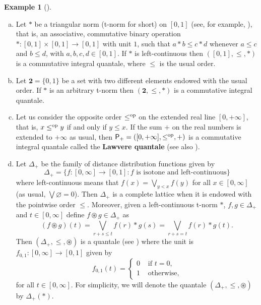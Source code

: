 \documentclass[11pt,a4paper]{amsart}
\theoremstyle{definition}
\newtheorem{example}[theorem]{Example}
\begin{document}
	
	
	
	
	
	\begin{example}[\mbox{\cite[Example II.1.10.1]{BookMonoidalTopology}}]\label{ex:quantales}\
		\begin{enumerate}[(a)]
			\item Let $\ast$ be a triangular norm (t-norm for short) on $[0,1]$ (see, for example, \cite{BookTN}), that is, an associative, commutative binary operation $\ast\colon[0,1]\times [0,1]\rightarrow [0,1]$ with unit $1$, such that $a\ast b\leq c\ast d$ whenever $a\leq c$ and $b\leq d$, with $a,b,c,d\in [0,1]$. If $\ast$ is left-continuous then $([0,1],\leq,\ast)$ is a commutative integral quantale, where $\leq$ is the usual order.
			\item Let $\mathbf{2}=\{0,1\}$ be a set with two different elements endowed with the usual order. If $\ast$ is an arbitrary t-norm then $(\mathbf{2},\leq,\ast)$ is a commutative integral quantale.
			\item  Let us consider the opposite order $\leq^\text{\normalfont op}$ on the extended real line $[0,+\infty]$, that is, $x\leq^\text{\normalfont op} y$ if and only if $y\leq x$. If the sum $+$ on the real numbers is extended to $+\infty$ as usual, then $\mathsf{P}_+=([0,+\infty],\leq^\text{\normalfont op},+)$ is a commutative integral quantale called the \textbf{Lawvere quantale} \cite{CookWeiss22} (see also \cite[Example II.1.10.1.(3)]{BookMonoidalTopology}).
			
			
			
			
			
			
			\item Let $\Delta_+$ be the family of distance distribution functions given by
			$$\Delta_+=\{f:[0,\infty]\to [0,1]: f\text{ is isotone and left-continuous} \}$$
			where left-continuous means that $f(x)=\bigvee_{y<x}f(y)$ for all $x\in [0,\infty]$ (as usual, $\bigvee\varnothing =0$). Then $\Delta_+$ is a complete lattice when it is endowed with the pointwise order $\leq$. 
			Moreover, given a left-continuous t-norm $\ast$, $f,g\in\Delta_+ $ and $t\in [0,\infty]$ define $f\circledast g\in \Delta_+ $ as
			$$(f\circledast g)(t)=\bigvee_{r+s\leq t}f(r)\ast g(s)=\bigvee_{r+s= t}f(r)\ast g(t).$$
			Then $(\Delta_+,\leq,\circledast)$ is a quantale (see \cite{Flagg97,HofReis13,JagerShi19}) where the unit is $f_{0,1}:[0,\infty]\to [0,1]$ given by
			$$f_{0,1}(t)=\begin{cases}
				0&\text{ if }t=0,\\
				1&\text{ otherwise},
			\end{cases}$$
			for all $t\in [0,\infty].$ For simplicity, we will denote the quantale $(\Delta_+,\leq,\circledast)$ by $\Delta_+(\ast).$
		\end{enumerate}	
	\end{example}
	
\end{document}
